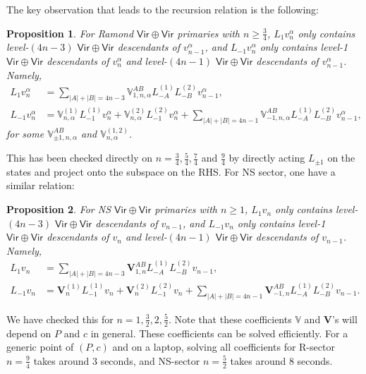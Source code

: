 \documentclass[12pt]{article}
\newcommand{\ie}{\begin{equation}\begin{aligned}}
\newcommand{\fe}{\end{aligned}\end{equation}}
\numberwithin{equation}{section}
\newtheorem{proposition}{Proposition}
\begin{document}
The key observation that leads to the recursion relation is the following:
\begin{proposition}
For Ramond $\mathsf{Vir\oplus Vir}$ primaries with $n\geq \frac{3}{4}$, $L_{1} v_n^\alpha$ only contains level-$(4n-3)$ $\mathsf{Vir\oplus Vir}$ descendants of $v_{n-1}^\alpha$, and $L_{-1} v_n^\alpha$ only contains level-1 $\mathsf{Vir\oplus Vir}$ descendants of $v_n^\alpha$ and level-$(4n-1)$ $\mathsf{Vir\oplus Vir}$ descendants of $v_{n-1}^\alpha$. Namely,
\ie
L_1 v_n^\alpha &= \sum_{|A|+|B|=4n-3} \mathbb{V}_{1,n,\alpha}^{AB} L_{-A}^{(1)}L_{-B}^{(2)} v_{n-1}^\alpha,\\
L_{-1} v_n^\alpha &= \mathbb{V}_{n,\alpha}^{(1)} L_{-1}^{(1)}v_n^\alpha + \mathbb{V}_{n,\alpha}^{(2)} L_{-1}^{(2)}v_n^\alpha + \sum_{|A|+|B|=4n-1} \mathbb{V}_{-1,n,\alpha}^{AB} L_{-A}^{(1)}L_{-B}^{(2)} v_{n-1}^\alpha,
\fe
for some $\mathbb{V}_{\pm 1,n,\alpha}^{AB}$ and $\mathbb{V}_{n,\alpha}^{(1,2)}$. 
\end{proposition}

This has been checked directly on $n=\frac{3}{4}, \frac{5}{4}, \frac{7}{4}$ and $\frac{9}{4}$ by directly acting $L_{\pm 1}$ on the states and project onto the subspace on the RHS. For NS sector, one have a similar relation:
\begin{proposition}
For NS $\mathsf{Vir\oplus Vir}$ primaries with $n\geq 1$, $L_{1} v_n$ only contains level-$(4n-3)$ $\mathsf{Vir\oplus Vir}$ descendants of $v_{n-1}$, and $L_{-1} v_n$ only contains level-1 $\mathsf{Vir\oplus Vir}$ descendants of $v_n$ and level-$(4n-1)$ $\mathsf{Vir\oplus Vir}$ descendants of $v_{n-1}$. Namely,
\ie
L_1 v_n &= \sum_{|A|+|B|=4n-3} \mathbf{V}_{1,n}^{AB} L_{-A}^{(1)}L_{-B}^{(2)} v_{n-1},\\
L_{-1} v_n &= \mathbf{V}_{n}^{(1)} L_{-1}^{(1)}v_n + \mathbf{V}_{n}^{(2)} L_{-1}^{(2)}v_n + \sum_{|A|+|B|=4n-1} \mathbf{V}_{-1,n}^{AB} L_{-A}^{(1)}L_{-B}^{(2)} v_{n-1}.
\fe
\end{proposition}

We have checked this for $n=1,\frac{3}{2}, 2, \frac{5}{2}$. Note that these coefficients $\mathbb{V}$ and $\mathbf{V}$'s will depend on $P$ and $c$ in general. These coefficients can be solved efficiently. For a generic point of $(P, c)$ and on a laptop, solving all coefficients for R-sector $n=\frac{9}{4}$ takes around 3 seconds, and NS-sector $n=\frac{5}{2}$ takes around 8 seconds.
\end{document}
